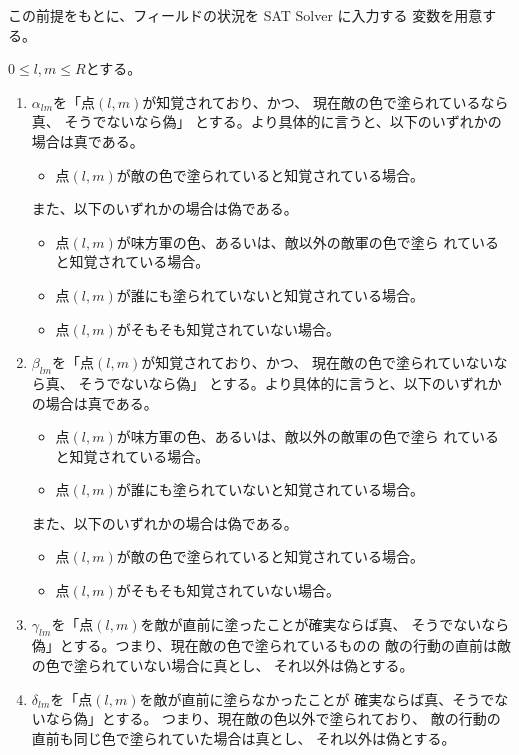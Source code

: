 この前提をもとに、フィールドの状況を SAT Solver に入力する
変数を用意する。
\begin{nota}[塗りのためのフィールドからの制約変数] \label{nota:field_var}
 $0 \leq l, m \leq R$とする。
 \begin{enumerate}[1.]
  \item $\alpha_{lm}$を「点$(l, m)$が知覚されており、かつ、
        現在敵の色で塗られているなら真、
        そうでないなら偽」
        とする。より具体的に言うと、以下のいずれかの場合は真である。
        \begin{itemize}
         \item 点$(l, m)$が敵の色で塗られていると知覚されている場合。
        \end{itemize}
        また、以下のいずれかの場合は偽である。
        \begin{itemize}
         \item 点$(l, m)$が味方軍の色、あるいは、敵以外の敵軍の色で塗ら
               れていると知覚されている場合。
         \item 点$(l, m)$が誰にも塗られていないと知覚されている場合。
         \item 点$(l, m)$がそもそも知覚されていない場合。
        \end{itemize}
  \item $\beta_{lm}$を「点$(l, m)$が知覚されており、かつ、
        現在敵の色で塗られていないなら真、
        そうでないなら偽」
        とする。より具体的に言うと、以下のいずれかの場合は真である。
        \begin{itemize}
         \item 点$(l, m)$が味方軍の色、あるいは、敵以外の敵軍の色で塗ら
               れていると知覚されている場合。
         \item 点$(l, m)$が誰にも塗られていないと知覚されている場合。
        \end{itemize}
        また、以下のいずれかの場合は偽である。
        \begin{itemize}
         \item 点$(l, m)$が敵の色で塗られていると知覚されている場合。
         \item 点$(l, m)$がそもそも知覚されていない場合。
        \end{itemize}
  \item $\gamma_{lm}$を「点$(l, m)$を敵が直前に塗ったことが確実ならば真、
        そうでないなら偽」とする。つまり、現在敵の色で塗られているものの
        敵の行動の直前は敵の色で塗られていない場合に真とし、
        それ以外は偽とする。
  \item $\delta_{lm}$を「点$(l, m)$を敵が直前に塗らなかったことが
        確実ならば真、そうでないなら偽」とする。
        つまり、現在敵の色以外で塗られており、
        敵の行動の直前も同じ色で塗られていた場合は真とし、
        それ以外は偽とする。
 \end{enumerate}
\end{nota}

